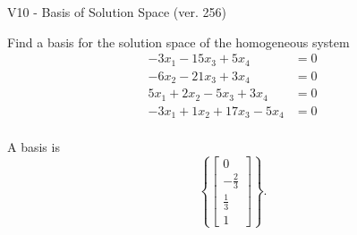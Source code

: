 \begin{exercise}
  \begin{exerciseTitle}V10 - Basis of Solution Space (ver. 256)\end{exerciseTitle}
  \begin{exerciseStatement}
    Find a basis for the solution space of the homogeneous system 
\begin{align*}
 -3 x_ 1 -15 x_ 3 + 5 x_ 4 &= 0  \\ 
  -6 x_ 2 -21 x_ 3 + 3 x_ 4 &= 0  \\ 
  5 x_ 1 + 2 x_ 2 -5 x_ 3 + 3 x_ 4 &= 0  \\ 
  -3 x_ 1 + 1 x_ 2 + 17 x_ 3 -5 x_ 4 &= 0  \\ 
 \end{align*}


 
  \end{exerciseStatement}

  \begin{exerciseAnswer}
   A basis is   
\[\left\{\left[\begin{array}{c}
0 \\
-\frac{2}{3} \\
\frac{1}{3} \\
1
\end{array}\right]\right\}.\]

  


  \end{exerciseAnswer}
\end{exercise}